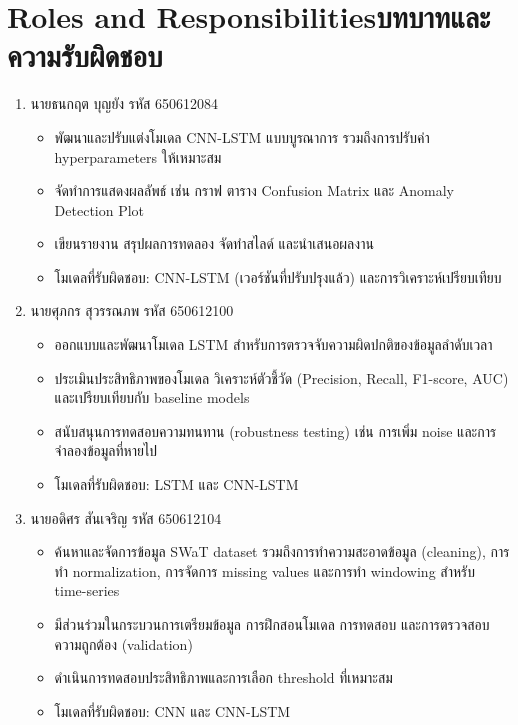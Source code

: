 \section{\ifenglish Roles and Responsibilities\else บทบาทและความรับผิดชอบ\fi}
\begin{enumerate}
    \item นายธนกฤต บุญยัง รหัส 650612084
    \begin{itemize}
        \item พัฒนาและปรับแต่งโมเดล CNN-LSTM แบบบูรณาการ รวมถึงการปรับค่า hyperparameters ให้เหมาะสม
        \item จัดทำการแสดงผลลัพธ์ เช่น กราฟ ตาราง Confusion Matrix และ Anomaly Detection Plot
        \item เขียนรายงาน สรุปผลการทดลอง จัดทำสไลด์ และนำเสนอผลงาน
        \item โมเดลที่รับผิดชอบ: CNN-LSTM (เวอร์ชันที่ปรับปรุงแล้ว) และการวิเคราะห์เปรียบเทียบ  
    \end{itemize}

    \item นายศุภกร สุวรรณภพ รหัส 650612100  
    \begin{itemize}
        \item ออกแบบและพัฒนาโมเดล LSTM สําหรับการตรวจจับความผิดปกติของข้อมูลลําดับเวลา
        \item ประเมินประสิทธิภาพของโมเดล วิเคราะห์ตัวชี้วัด (Precision, Recall, F1-score, AUC) และเปรียบเทียบกับ baseline models
        \item สนับสนุนการทดสอบความทนทาน (robustness testing) เช่น การเพิ่ม noise และการจำลองข้อมูลที่หายไป
        \item โมเดลที่รับผิดชอบ: LSTM และ CNN-LSTM  
    \end{itemize}

    \item นายอดิศร สันเจริญ รหัส 650612104
    \begin{itemize}
        \item ค้นหาและจัดการข้อมูล SWaT dataset รวมถึงการทำความสะอาดข้อมูล (cleaning), การทำ normalization, การจัดการ missing values และการทำ windowing สำหรับ time-series
        \item มีส่วนร่วมในกระบวนการเตรียมข้อมูล การฝึกสอนโมเดล การทดสอบ และการตรวจสอบความถูกต้อง (validation)
        \item ดำเนินการทดสอบประสิทธิภาพและการเลือก threshold ที่เหมาะสม
        \item โมเดลที่รับผิดชอบ: CNN และ CNN-LSTM
    \end{itemize}
\end{enumerate}


